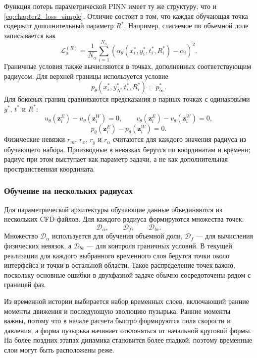\documentclass[12pt,a4paper]{article}
\begin{document}
Функция потерь параметрической PINN имеет ту же структуру, что и
\eqref{eq:chapter2_loss_simple}. Отличие состоит в том, что каждая обучающая
точка содержит дополнительный параметр \(R^*\). Например, слагаемое по объемной
доле записывается как
\begin{equation}
    \mathcal{L}_{\alpha}^{(R)}
    =
    \frac{1}{N_\alpha}
    \sum_{i=1}^{N_\alpha}
    \left(
        \alpha_\theta(x_i^*,y_i^*,t_i^*,R_i^*)-\alpha_i
    \right)^2.
\end{equation}
Граничные условия также вычисляются в точках, дополненных соответствующим
радиусом. Для верхней границы используется условие
\[
    p_\theta(x_i^*,y_N^*,t_i^*,R_i^*)=p_\infty^*.
\]
Для боковых границ сравниваются предсказания в парных точках с одинаковыми
\(y^*\), \(t^*\) и \(R^*\):
\[
    u_\theta(\mathbf{z}_i^E)-u_\theta(\mathbf{z}_i^W)=0,
    \qquad
    v_\theta(\mathbf{z}_i^E)-v_\theta(\mathbf{z}_i^W)=0,
\]
\[
    p_\theta(\mathbf{z}_i^E)-p_\theta(\mathbf{z}_i^W)=0.
\]
Физические невязки \(r_m\), \(r_x\), \(r_y\) и \(r_\alpha\) считаются для
каждого значения радиуса из обучающего набора. Производные в невязках берутся
по координатам и времени; радиус при этом выступает как параметр задачи, а не
как дополнительная пространственная координата.

\subsubsection{Обучение на нескольких радиусах}

Для параметрической архитектуры обучающие данные объединяются из нескольких
CFD-файлов. Для каждого радиуса формируются множества точек:
\[
    \mathcal{D}_\alpha,\qquad
    \mathcal{D}_f,\qquad
    \mathcal{D}_{bc}.
\]
Множество \(\mathcal{D}_\alpha\) используется для обучения объемной доли,
\(\mathcal{D}_f\) --- для вычисления физических невязок, а
\(\mathcal{D}_{bc}\) --- для контроля граничных условий. В текущей реализации
для каждого выбранного временного слоя берутся точки около интерфейса и точки в
остальной области. Такое распределение точек важно, поскольку основные ошибки
в двухфазной задаче обычно сосредоточены рядом с границей фаз.

Из временной истории выбирается набор временных слоев, включающий ранние
моменты движения и последующую эволюцию пузырька. Ранние моменты важны, потому
что в начале расчета быстро формируются поля скорости и давления, а форма
пузырька начинает отклоняться от начальной круговой формы. На более поздних
этапах динамика становится более гладкой, поэтому временные слои могут быть
расположены реже.
\end{document}
